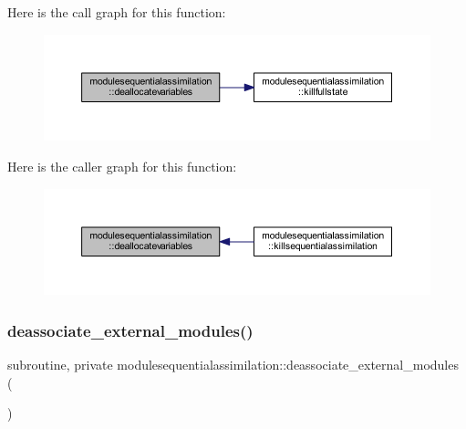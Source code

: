 Here is the call graph for this function\+:\nopagebreak
\begin{figure}[H]
\begin{center}
\leavevmode
\includegraphics[width=350pt]{namespacemodulesequentialassimilation_aa604c23d9d9ee0bb814f499c565fde3f_cgraph}
\end{center}
\end{figure}
Here is the caller graph for this function\+:\nopagebreak
\begin{figure}[H]
\begin{center}
\leavevmode
\includegraphics[width=350pt]{namespacemodulesequentialassimilation_aa604c23d9d9ee0bb814f499c565fde3f_icgraph}
\end{center}
\end{figure}
\mbox{\label{namespacemodulesequentialassimilation_adf87f0a5e3f8680e6eab41ee6c53dd51}} 
\subsubsection{\texorpdfstring{deassociate\+\_\+external\+\_\+modules()}{deassociate\_external\_modules()}}
{\footnotesize\ttfamily subroutine, private modulesequentialassimilation\+::deassociate\+\_\+external\+\_\+modules (\begin{DoxyParamCaption}{ }\end{DoxyParamCaption})\hspace{0.3cm}{\ttfamily [private]}}

